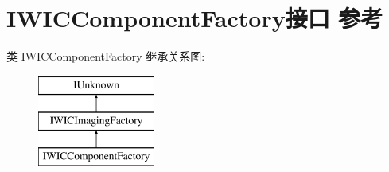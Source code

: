 \hypertarget{interface_i_w_i_c_component_factory}{}\section{I\+W\+I\+C\+Component\+Factory接口 参考}
\label{interface_i_w_i_c_component_factory}
类 I\+W\+I\+C\+Component\+Factory 继承关系图\+:\begin{figure}[H]
\begin{center}
\leavevmode
\includegraphics[height=3.000000cm]{interface_i_w_i_c_component_factory}
\end{center}
\end{figure}
